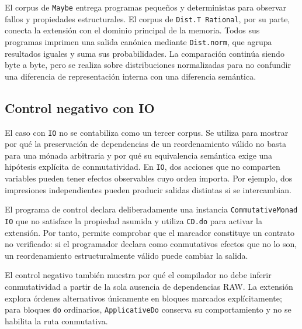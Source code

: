 \begin{table}[ht]
\centering
\TableSetup
{}
\caption{Familias específicas de cada corpus.}
\label{tab:validacion-familias-especificas}
\end{table}

El corpus de \texttt{Maybe} entrega programas pequeños y deterministas para observar fallos y propiedades estructurales. El corpus de \texttt{Dist.T Rational}, por su parte, conecta la extensión con el dominio principal de la memoria. Todos sus programas imprimen una salida canónica mediante \texttt{Dist.norm}, que agrupa resultados iguales y suma sus probabilidades. La comparación continúa siendo byte a byte, pero se realiza sobre distribuciones normalizadas para no confundir una diferencia de representación interna con una diferencia semántica.

\subsection{Control negativo con IO}

El caso con \texttt{IO} no se contabiliza como un tercer corpus. Se utiliza para mostrar por qué la preservación de dependencias de un reordenamiento válido no basta para una mónada arbitraria y por qué su equivalencia semántica exige una hipótesis explícita de conmutatividad. En \texttt{IO}, dos acciones que no comparten variables pueden tener efectos observables cuyo orden importa. Por ejemplo, dos impresiones independientes pueden producir salidas distintas si se intercambian.

El programa de control declara deliberadamente una instancia \texttt{CommutativeMonad IO} que no satisface la propiedad asumida y utiliza \texttt{CD.do} para activar la extensión. Por tanto, permite comprobar que el marcador constituye un contrato no verificado: si el programador declara como conmutativos efectos que no lo son, un reordenamiento estructuralmente válido puede cambiar la salida.

El control negativo también muestra por qué el compilador no debe inferir conmutatividad a partir de la sola ausencia de dependencias RAW. La extensión explora órdenes alternativos únicamente en bloques marcados explícitamente; para bloques \texttt{do} ordinarios, \texttt{ApplicativeDo} conserva su comportamiento y no se habilita la ruta conmutativa.
